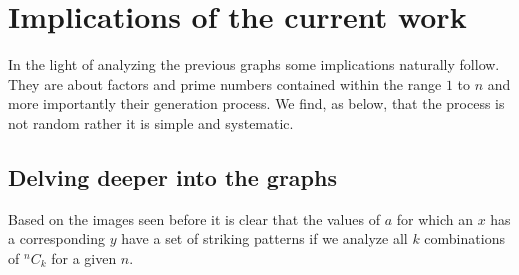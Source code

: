 \documentclass[12pt, twoside]{article}
\newcommand*{\Combination}[2]{{}^{#1}C_{#2}}%
\begin{document}
\section{Implications of the current work}
In the light of analyzing the previous graphs some implications naturally follow. They are about factors and prime numbers contained within the range $1$ to $n$ and more importantly their generation process. We find, as below, that the process is not random rather it is simple and systematic.
\subsection{Delving deeper into the graphs}
Based on the images seen before it is clear that the values of $a$ for which an $x$ has a corresponding $y$ have a set of striking patterns if we analyze all $k$ combinations of $\Combination{n}{k}$ for a given $n$. 
\end{document}

